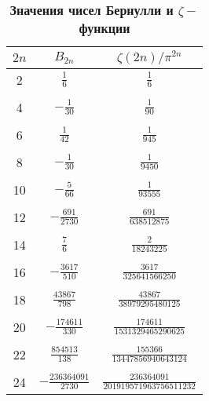 \begin{table}[]
\caption{\textbf{Значения чисел Бернулли и $\zeta -$функции}}
\begin{center}
\begin{tabular}{|c|c|c|}
\hline
$2n$ & $B_{2n}$ & $\zeta (2n)/ \pi^{2n}$ \\
\hline
2  & $\frac{1}{6}$   & $\frac{1}{6}$ \\
\\
4  & $-\frac{1}{30}$ & $\frac{1}{90}$ \\
\\
6  & $\frac{1}{42}$  & $\frac{1}{945}$ \\
\\
8  & $-\frac{1}{30}$ & $\frac{1}{9450}$ \\
\\
10 & $-\frac{5}{66}$ & $\frac{1}{93555}$ \\
\\
12 & $-\frac{691}{2730}$ & $\frac{691}{638512875}$ \\
\\
14 & $\frac{7}{6}$ & $\frac{2}{18243225}$ \\
\\
16 & $-\frac{3617}{510}$ & $\frac{3617}{325641566250}$ \\
 \\
18 & $\frac{43867}{798}$ & $\frac{43867}{38979295480125}$ \\
\\
20 & $-\frac{174611}{330}$ & $\frac{174611}{1531329465290625}$ \\
\\
22 & $\frac{854513}{138}$ & $\frac{155366}{13447856940643124}$ \\
\\
24 & $-\frac{236364091}{2730}$ & $\frac{236364091}{201919571963756511232}$ \\
\hline
\end{tabular}
\end{center}
\end{table}